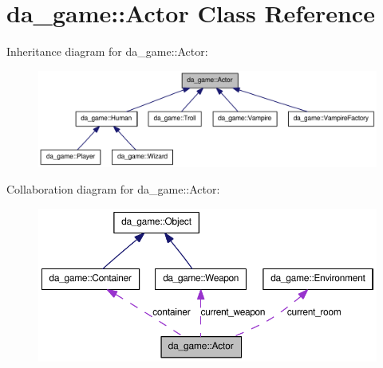 \hypertarget{classda__game_1_1Actor}{
\section{da\_\-game::Actor Class Reference}
\label{classda__game_1_1Actor}
}
Inheritance diagram for da\_\-game::Actor:\nopagebreak
\begin{figure}[H]
\begin{center}
\leavevmode
\includegraphics[width=400pt]{classda__game_1_1Actor__inherit__graph}
\end{center}
\end{figure}
Collaboration diagram for da\_\-game::Actor:\nopagebreak
\begin{figure}[H]
\begin{center}
\leavevmode
\includegraphics[width=394pt]{classda__game_1_1Actor__coll__graph}
\end{center}
\end{figure}
